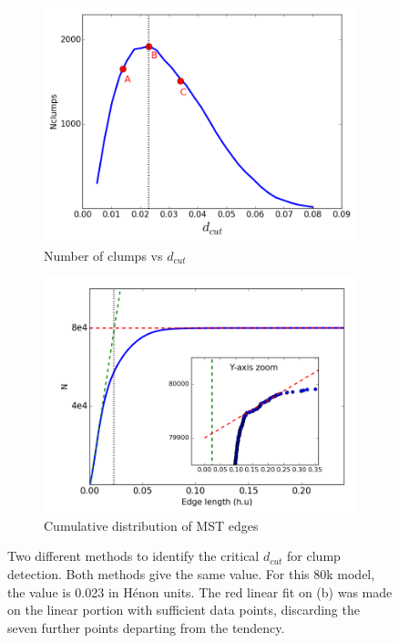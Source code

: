 \begin{figure}
    \centering
    \begin{subfigure}[b]{0.49\textwidth}
    	\centering
    	\includegraphics[width=\textwidth]{Figures/2_Ndcut.png}
        \caption{Number of clumps vs $d_{cut}$}
        \label{Fig:2_Ndcut}
    \end{subfigure}
    \begin{subfigure}[b]{0.49\textwidth}
    	\centering
    	\includegraphics[width=\textwidth]{Figures/2_dcutdistribution.png}
        \caption{Cumulative distribution of MST edges}
        \label{Fig:2_dcutcumulated}
    \end{subfigure}
\caption{Two different methods to identify the critical $d_{cut}$ for clump detection. Both methods give the same value. For this 80k model, the value is 0.023 in H\'enon units. The red linear fit on (b) was made on the linear portion with sufficient data points, discarding the  seven further points departing from the tendency.}
\label{Fig:0_dcutchoice}
\end{figure}


